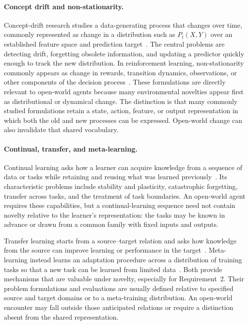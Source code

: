 \paragraph{Concept drift and non-stationarity.}
Concept-drift research studies a data-generating process that changes over time, commonly represented as change in a distribution such as \(P_t(X,Y)\) over an established feature space and prediction target~\citep{widmer1996learning,gama2014survey,lu2019concept}.
The central problems are detecting drift, forgetting obsolete information, and updating a predictor quickly enough to track the new distribution.
In reinforcement learning, non-stationarity commonly appears as change in rewards, transition dynamics, observations, or other components of the decision process~\citep{khetarpal2022continual,feng2022fans}.
These formulations are directly relevant to open-world agents because many environmental novelties appear first as distributional or dynamical change.
The distinction is that many commonly studied formulations retain a state, action, feature, or output representation in which both the old and new processes can be expressed.
Open-world change can also invalidate that shared vocabulary.

\paragraph{Continual, transfer, and meta-learning.}
Continual learning asks how a learner can acquire knowledge from a sequence of data or tasks while retaining and reusing what was learned previously~\citep{ring1994continual,thrun1995lifelong,parisi2019continual,hadsell2020embracing,khetarpal2022continual}.
Its characteristic problems include stability and plasticity, catastrophic forgetting, transfer across tasks, and the treatment of task boundaries.
An open-world agent requires these capabilities, but a continual-learning sequence need not contain novelty relative to the learner's representation: the tasks may be known in advance or drawn from a common family with fixed inputs and outputs.

Transfer learning starts from a source--target relation and asks how knowledge from the source can improve learning or performance in the target~\citep{taylor2009transfer}.
Meta-learning instead learns an adaptation procedure across a distribution of training tasks so that a new task can be learned from limited data~\citep{finn2017maml}.
Both provide mechanisms that are valuable under novelty, especially for Requirement~2.
Their problem formulations and evaluations are usually defined relative to specified source and target domains or to a meta-training distribution.
An open-world encounter may fall outside those anticipated relations or require a distinction absent from the shared representation.

